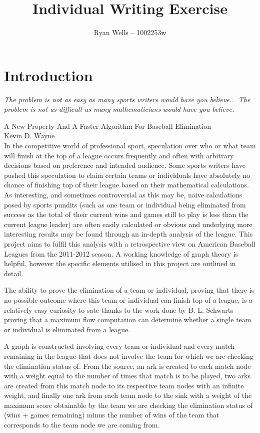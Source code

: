 \documentclass{report}
\title{Individual Writing Exercise}
\author{Ryan Wells -- 1002253w}
\begin{document}
\maketitle
\section*{Introduction}

\emph{The problem is not as easy as many sports writers would have you believe... The problem is not as difficult as many mathematicians would have you believe.}

A New Property And A Faster Algorithm For Baseball Elimination\\
Kevin D. Wayne\\

In the competitive world of professional sport, speculation over who or what team will finish at the top of a league occurs frequently and often with arbitrary decisions based on preference and intended audience. Some sports writers have pushed this speculation to claim certain teams or individuals have absolutely no chance of finishing top of their league based on their mathematical calculations. As interesting, and sometimes controversial as this may be, na\"{\i}ve calculations posed by sports pundits (such as one team or individual being eliminated from success as the total of their current wins and games still to play is less than the current league leader) are often easily calculated or obvious and underlying more interesting results may be found through an in-depth analysis of the league. This project aims to fulfil this analysis with a retrospective view on American Baseball Leagues from the 2011-2012 season. A working knowledge of graph theory is helpful, however the specific elements utilised in this project are outlined in detail. 

The ability to prove the elimination of a team or individual, proving that there is no possible outcome where this team or individual can finish top of a league, is a relatively easy curiosity to sate thanks to the work done by B. L. Schwarts proving that a maximum flow computation can determine whether a single team or individual is eliminated from a league. 

A graph is constructed involving every team or individual and every match remaining in the league that does not involve the team for which we are checking the elimination status of. From the source, an ark is created to each match node with a weight equal to the number of times that match is to be played, two arks are created from this match node to its respective team nodes with an infinite weight, and finally one ark from each team node to the sink with a weight of the maximum score obtainable by the team we are checking the elimination status of (wins + games remaining) minus the number of wins of the team that corresponds to the team node we are coming from. 
\end{document}
